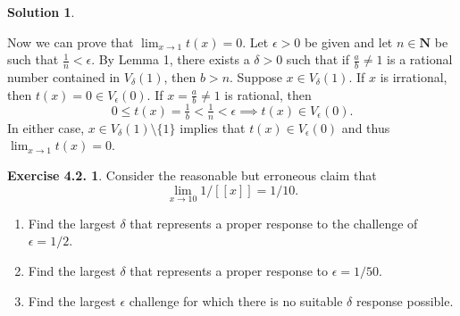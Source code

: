 \documentclass[12pt]{article}
\theoremstyle{definition}
\theoremstyle{exercise}
\newtheorem{exercise}{Exercise 4.2.}
\theoremstyle{solution}
\newtheorem*{solution}{Solution}
\newcommand{\N}{\mathbf{N}}
\begin{document}
\begin{solution}
\begin{enumerate}
        Now we can prove that \( \lim_{x \to 1} t(x) = 0 \). Let \( \epsilon > 0 \) be given and let \( n \in \N \) be such that \( \tfrac{1}{n} < \epsilon \). By Lemma 1, there exists a \( \delta > 0 \) such that if \( \tfrac{a}{b} \neq 1 \) is a rational number contained in \( V_{\delta}(1) \), then \( b > n \). Suppose \( x \in V_{\delta}(1) \). If \( x \) is irrational, then \( t(x) = 0 \in V_{\epsilon}(0) \). If \( x = \tfrac{a}{b} \neq 1 \) is rational, then
        \[
            0 \leq t(x) = \tfrac{1}{b} < \tfrac{1}{n} < \epsilon \implies t(x) \in V_{\epsilon}(0).
        \]
        In either case, \( x \in V_{\delta}(1) \setminus \{ 1 \} \) implies that \( t(x) \in V_{\epsilon}(0) \) and thus \( \lim_{x \to 1} t(x) = 0 \).
    \end{enumerate}
\end{solution}

\begin{exercise}
\label{ex:4}
    Consider the reasonable but erroneous claim that
    \[
        \lim_{x \to 10} 1/[[x]] = 1/10.
    \]
    \begin{enumerate}
        \item Find the largest \( \delta \) that represents a proper response to the challenge of \( \epsilon = 1/2 \).

        \item Find the largest \( \delta \) that represents a proper response to \( \epsilon = 1/50 \).

        \item Find the largest \( \epsilon \) challenge for which there is no suitable \( \delta \) response possible.
    \end{enumerate}
\end{exercise}
\end{document}
